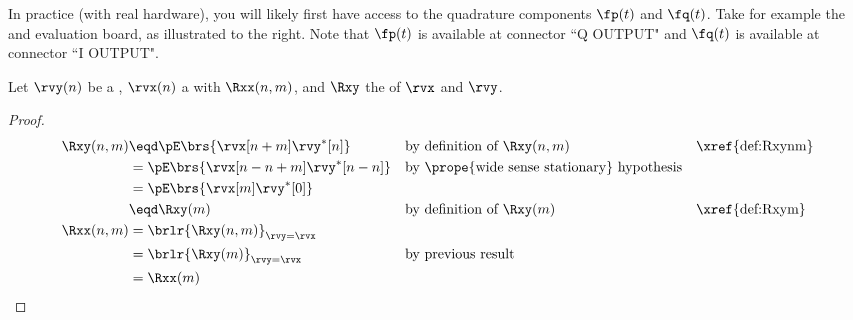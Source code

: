 \begin{remark}
\begin{minipage}{\tw-60mm}
In practice (with real hardware), you will likely first have access to
the quadrature components $\fp(t)$ and $\fq(t)$.
Take for example the  and
evaluation board, as illustrated to the right.\footnotemark
Note that  $\fp(t)$ is available at connector ``Q OUTPUT"
     and      $\fq(t)$ is available at connector ``I OUTPUT".
\end{minipage}\hfill{}
\end{remark}

\begin{proposition}
\label{prop:Rxynmm}
\label{prop:Rxxnmm}
Let $\rvy(n)$ be a ,
    $\rvx(n)$    a  with  $\Rxx(n,m)$,
and $\Rxy$    the  of $\rvx$ and $\rvy$.
\end{proposition}
\begin{proof}
\begin{align*}
  \Rxy(n,m)
     &\eqd \pE\brs{\rvx[n+m]\rvy^\ast[n]}
     &&    \text{by definition of $\Rxy(n,m)$}
     &&    \text{\xref{def:Rxynm}}
   \\&=    \pE\brs{\rvx[n-n+m]\rvy^\ast[n-n]}
     &&    \text{by \prope{wide sense stationary} hypothesis}
   \\&=    \pE\brs{\rvx[m]\rvy^\ast[0]}
   \\&\eqd \Rxy(m)
     && \text{by definition of $\Rxy(m)$}
     && \text{\xref{def:Rxym}}
   \\
  \Rxx(n,m)
     &=    \brlr{\Rxy(n,m)}_{\rvy=\rvx}
   \\&=    \brlr{\Rxy(m)}_{\rvy=\rvx}
     && \text{by previous result}
   \\&= \Rxx(m)
\end{align*}
\end{proof}


